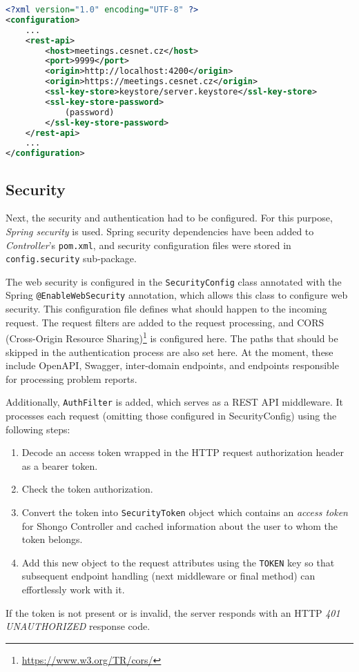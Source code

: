 \begin{lstlisting}[language=XML, caption=REST configuration example, label=conf]
<?xml version="1.0" encoding="UTF-8" ?>
<configuration>
    ...
    <rest-api>
        <host>meetings.cesnet.cz</host>
        <port>9999</port>
        <origin>http://localhost:4200</origin>
        <origin>https://meetings.cesnet.cz</origin>
        <ssl-key-store>keystore/server.keystore</ssl-key-store>
        <ssl-key-store-password>
            (password)
        </ssl-key-store-password>
    </rest-api>
    ...
</configuration>
\end{lstlisting}

\subsection{Security}
Next, the security and authentication had to be configured. For this purpose, \emph{Spring security} is used. Spring security dependencies have been added to \emph{Controller}'s \texttt{pom.xml}, and security configuration files were stored in \texttt{config.security} sub-package.

The web security is configured in the \texttt{SecurityConfig} class annotated with the Spring \texttt{@EnableWebSecurity} annotation, which allows this class to configure web security\cite{springdocumentation}.
This configuration file defines what should happen to the incoming request. The request filters are added to the request processing, and CORS (Cross-Origin Resource Sharing)\footnote{\url{https://www.w3.org/TR/cors/}} is configured here. The paths that should be skipped in the authentication process are also set here. At the moment, these include OpenAPI, Swagger, inter-domain endpoints\cite{pavelka2016shongo}, and endpoints responsible for processing problem reports.

Additionally, \texttt{AuthFilter} is added, which serves as a REST API middleware. It processes each request (omitting those configured in SecurityConfig) using the following steps:
\begin{enumerate}
    \item Decode an access token wrapped in the HTTP request authorization header as a bearer token.
    \item Check the token authorization.
    \item Convert the token into \texttt{SecurityToken} object which contains an \emph{access token} for Shongo Controller and cached information about the user to whom the token belongs.
    \item Add this new object to the request attributes using the \texttt{TOKEN} key so that subsequent endpoint handling (next middleware or final method) can effortlessly work with it.
\end{enumerate}
If the token is not present or is invalid, the server responds with an HTTP \emph{401 UNAUTHORIZED} response code.

